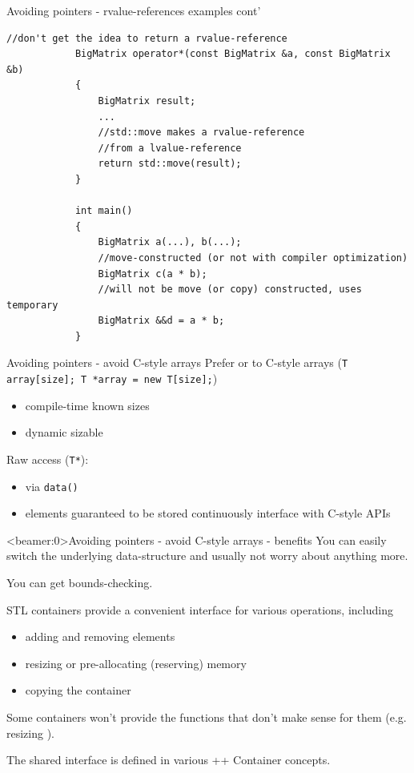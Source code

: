 	\begin{frame}[fragile=singleslide]{Avoiding pointers - rvalue-references examples cont'}
		\begin{lstlisting}[gobble=12]
			//don't get the idea to return a rvalue-reference
			BigMatrix operator*(const BigMatrix &a, const BigMatrix &b)
			{
			    BigMatrix result;
			    ...
			    //std::move makes a rvalue-reference
			    //from a lvalue-reference
			    return std::move(result);
			}
			
			int main()
			{
			    BigMatrix a(...), b(...);
			    //move-constructed (or not with compiler optimization)
			    BigMatrix c(a * b);
			    //will not be move (or copy) constructed, uses temporary
			    BigMatrix &&d = a * b;
			}
		\end{lstlisting}
	\end{frame}
	
	\begin{frame}{Avoiding pointers - avoid C-style arrays}
		Prefer  or  to C-style arrays (\lstinline|T array[size]; T *array = new T[size];|)
		
		\begin{itemize}
			\item {} \rarrow compile-time known sizes \\ 
			\item {} \rarrow dynamic sizable
		\end{itemize}
		
		\pause
		
		\emptyline
		Raw access (\lstinline|T*|):
		\begin{itemize}
			\item via \lstinline|data()|
			\item elements guaranteed to be stored continuously \rarrow interface with C-style APIs
		\end{itemize}
	\end{frame}
	
	\begin{frame}<beamer:0>{Avoiding pointers - avoid C-style arrays - benefits}
		You can easily switch the underlying data-structure and usually not worry about anything more.
		
		
		\emptyline
		You can get bounds-checking.
		
		\emptyline
		STL containers provide a convenient interface for various operations, including
		\begin{itemize}
			\item adding and removing elements
			\item resizing or pre-allocating (reserving) memory
			\item copying the container
		\end{itemize}
		
		Some containers won't provide the functions that don't make sense for them (e.g. resizing ).
		
		The shared interface is defined in various \C++ Container concepts.
	\end{frame}
	
